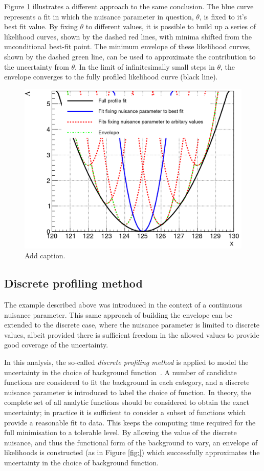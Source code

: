 Figure \ref{fig:nuisance_illustration} illustrates a different approach to the same conclusion. The blue curve represents a fit in which the nuisance parameter in question, $\theta$, is fixed to it's best fit value. By fixing $\theta$ to different values, it is possible to build up a series of likelihood curves, shown by the dashed red lines, with minima shifted from the unconditional best-fit point. The minimum envelope of these likelihood curves, shown by the dashed green line, can be used to approximate the contribution to the uncertainty from $\theta$. In the limit of infinitesimally small steps in $\theta$, the envelope converges to the fully profiled likelihood curve (black line).

\begin{figure}[hptb]
  \centering
  \includegraphics[width=.8\textwidth]{Figures/hgg_stats/nuisance_illustration.png}
  \caption[Constructing the envelope]
  {
    Add caption.
  }
  \label{fig:nuisance_illustration}
\end{figure}

\subsection{Discrete profiling method}
The example described above was introduced in the context of a continuous nuisance parameter. This same approach of building the envelope can be extended to the discrete case, where the nuisance parameter is limited to discrete values, albeit provided there is sufficient freedom in the allowed values to provide good coverage of the uncertainty.

In this analysis, the so-called \textit{discrete profiling method} is applied to model the uncertainty in the choice of background function~\cite{Dauncey:2014xga}. A number of candidate functions are considered to fit the background in each category, and a discrete nuisance parameter is introduced to label the choice of function. In theory, the complete set of all analytic functions should be considered to obtain the exact uncertainty; in practice it is sufficient to consider a subset of functions which provide a reasonable fit to data. This keeps the computing time required for the full minimisation to a tolerable level. By allowing the value of the discrete nuisance, and thus the functional form of the background to vary, an envelope of likelihoods is constructed (as in Figure \ref{fig:}) which successfully approximates the uncertainty in the choice of background function.


